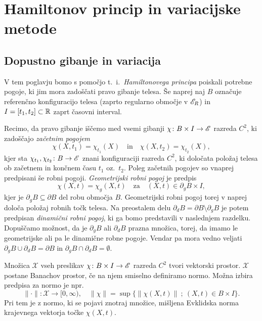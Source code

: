 \chapter{Hamiltonov princip in variacijske metode}


\section{Dopustno gibanje in variacija}


V tem poglavju bomo s pomočjo t.~i.~\emph{Hamiltonovega principa} poiskali potrebne pogoje,
ki jim mora zadoščati pravo gibanje telesa. Še naprej naj $B$ označuje referenčno konfiguracijo
telesa (zaprto regularno območje v $\mathscr E_R$) in $I=[t_1,t_2]\subset\mathbb R$ zaprt časovni interval.

Recimo, da pravo gibanje iščemo med vsemi gibanji
$\chi\colon B\times I\to\mathscr E$ razreda $C^2$, ki zadoščajo \emph{začetnim pogojem}
\[ \chi(X,t_1)=\chi_{t_1}(X)\quad\textrm{in}\quad \chi(X,t_2)=\chi_{t_2}(X), \]
kjer sta $\chi_{t_1},\chi_{t_2}\colon B\to\mathscr E$ znani konfiguraciji razreda $C^2$, ki
določata položaj telesa ob začetnem in končnem času $t_1$ oz.~$t_2$.
Poleg začetnih pogojev so vnaprej predpisani še robni pogoji. \emph{Geometrijski robni pogoj} je predpis
\begin{equation*} \label{e:grp}
	\chi(X,t)=\chi_g(X,t)\quad\mathrm{za}\quad (X,t)\in \partial_g B\times I,
\end{equation*}
kjer je $\partial_g B\subseteq\partial B$ del robu območja $B$.
Geometrijski robni pogoj torej v naprej določa položaj robnih točk telesa.
Na preostalem delu $\partial_d B=\partial B \setminus \partial_g B$
je potem predpisan \emph{dinamični robni pogoj}, ki ga bomo predstavili v naslednjem razdelku.
Dopuščamo možnost, da je $\partial_g B$ ali $\partial_d B$ prazna množica, torej,
da imamo le geometrijske ali pa le dinamične robne pogoje. Vendar pa mora vedno veljati
$\partial_g B\cup\partial_d B=\partial B$ in $\partial_g B\cap\partial_d B=\emptyset$.

Množica $\mathcal{X}$ vseh preslikav $\chi\colon B\times I\to\mathscr E$
razreda $C^2$ tvori vektorski prostor.
$\mathcal{X}$ postane Banachov prostor, če na njem smiselno definiramo normo. Možna izbira
predpisa za normo je npr.
\[
	\|\cdot\|\colon\mathcal{X}\to[0,\infty),\quad
	\|\chi\|=\sup\big\{\|\chi(X,t)\|\: ;\ (X,t)\in B\times I\big\}.
\]
Pri tem je z normo, ki se pojavi znotraj množice, mišljena Evklidska norma krajevnega vektorja točke $\chi(X,t)$.

